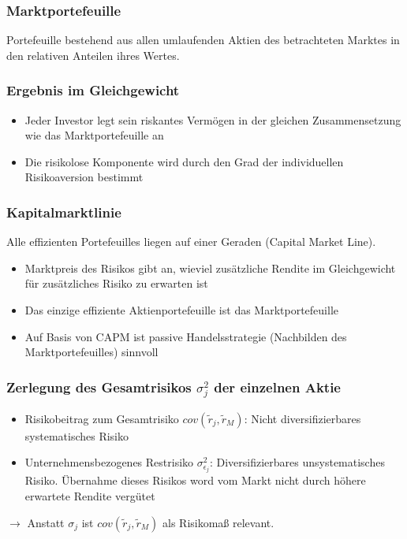 \subsubsection{Marktportefeuille}
Portefeuille bestehend aus allen umlaufenden Aktien des betrachteten Marktes in den relativen Anteilen ihres Wertes.

\subsubsection{Ergebnis im Gleichgewicht}
\begin{itemize}
	\item Jeder Investor legt sein riskantes Vermögen in der gleichen Zusammensetzung wie das Marktportefeuille an
	\item Die risikolose Komponente wird durch den Grad der individuellen Risikoaversion bestimmt
\end{itemize}

\subsubsection{Kapitalmarktlinie}
Alle effizienten Portefeuilles liegen auf einer Geraden (Capital Market Line).
\begin{itemize}
	\item Marktpreis des Risikos gibt an, wieviel zusätzliche Rendite im Gleichgewicht für zusätzliches Risiko zu erwarten ist
	\item Das einzige effiziente Aktienportefeuille ist das Marktportefeuille
	\item Auf Basis von CAPM ist passive Handelsstrategie (Nachbilden des Marktportefeuilles) sinnvoll
\end{itemize}

\subsubsection{Zerlegung des Gesamtrisikos \(\sigma_j^2\) der einzelnen Aktie}
\begin{itemize}
	\item Risikobeitrag zum Gesamtrisiko \(cov(\tilde{r}_j, \tilde{r}_M)\): Nicht diversifizierbares systematisches Risiko
	\item Unternehmensbezogenes Restrisiko \(\sigma_{\epsilon_j}^2\): Diversifizierbares unsystematisches Risiko. Übernahme dieses Risikos word vom Markt nicht durch höhere erwartete Rendite vergütet
\end{itemize}
$\rightarrow$ Anstatt \(\sigma_j\) ist \(cov(\tilde{r}_j, \tilde{r}_M)\) als Risikomaß relevant.


